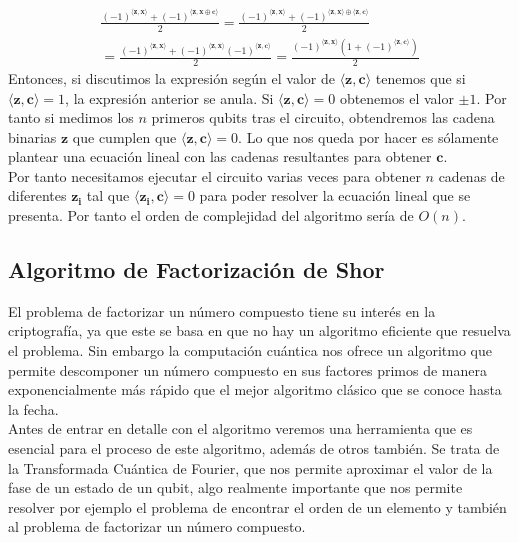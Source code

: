 \documentclass[a4paper]{article}
\numberwithin{equation}{section}
\begin{document}
\begin{equation}
\begin{split}
\frac{(-1)^{\langle\mathbf{z}, \mathbf{x}\rangle} + (-1)^{\langle\mathbf{z}, \mathbf{x}\oplus\mathbf{c}\rangle}}{2}
= 
\frac{(-1)^{\langle\mathbf{z}, \mathbf{x}\rangle} + (-1)^{\langle\mathbf{z}, \mathbf{x}\rangle \oplus \langle \mathbf{z}, \mathbf{c}\rangle}}{2}
\\=
\frac{(-1)^{\langle\mathbf{z}, \mathbf{x}\rangle} + (-1)^{\langle\mathbf{z}, \mathbf{x}\rangle}(-1)^{ \langle \mathbf{z}, \mathbf{c}\rangle}}{2}
=
\frac{(-1)^{\langle\mathbf{z}, \mathbf{x}\rangle} (1 + (-1)^{ \langle \mathbf{z}, \mathbf{c}\rangle})}{2}
\end{split}
\end{equation}
Entonces, si discutimos la expresión según el valor de $\langle \mathbf{z}, \mathbf{c} \rangle$ tenemos que si $\langle \mathbf{z}, \mathbf{c} \rangle = 1$, la expresión anterior se anula. Si $\langle \mathbf{z}, \mathbf{c} \rangle = 0$ obtenemos el valor $\pm 1$. Por tanto si medimos los $n$ primeros qubits tras el circuito, obtendremos las cadena binarias $\mathbf{z}$ que cumplen que $\langle \mathbf{z}, \mathbf{c} \rangle = 0$. Lo que nos queda por hacer es sólamente plantear una ecuación lineal con las cadenas resultantes para obtener $\mathbf{c}$.\\
\linebreak
Por tanto necesitamos ejecutar el circuito varias veces para obtener $n$ cadenas de diferentes $\mathbf{z_i}$ tal que $\langle \mathbf{z_i}, \mathbf{c} \rangle = 0$ para poder resolver la ecuación lineal que se presenta. Por tanto el orden de complejidad del algoritmo sería de $O(n)$.

\newpage

\subsection{Algoritmo de Factorización de Shor}
El problema de factorizar un número compuesto tiene su interés en la criptografía, ya que este se basa en que no hay un algoritmo eficiente que resuelva el problema. Sin embargo la computación cuántica nos ofrece un algoritmo que permite descomponer un número compuesto en sus factores primos de manera exponencialmente más rápido que el mejor algoritmo clásico que se conoce hasta la fecha.\\
\linebreak
Antes de entrar en detalle con el algoritmo veremos una herramienta que es esencial para el proceso de este algoritmo, además de otros también. Se trata de la Transformada Cuántica de Fourier, que nos permite aproximar el valor de la fase de un estado de un qubit, algo realmente importante que nos permite resolver por ejemplo el problema de encontrar el orden de un elemento y también al problema de factorizar un número compuesto.\\
\end{document}
